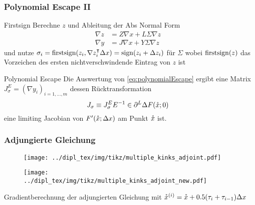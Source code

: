 \begin{frame}[<+->]
\frametitle{Polynomial Escape II}
\begin{block}{Firstsign}
 Berechne $z$ und Ableitung der Abs Normal Form
 \vspace*{-0.3cm}
 \begin{equation}\label{eq:polynomialEscape}
 \begin{aligned}
  \nabla z &= Z \nabla x + L \Sigma \nabla z\\
  \nabla y &= J\nabla x + Y\Sigma \nabla z
 \end{aligned}
 \end{equation}
 und nutze $
       \sigma_i = \operatorname{firstsign}(z_i,\nabla z_i^\intercal \Delta x) =\operatorname{sign} (z_i + \Delta z_i)
      $ für $\Sigma$
wobei $\operatorname{firstsign}(z)$ das Vorzeichen des ersten nichtverschwindende Eintrag von $z$ ist
\end{block}
\begin{block}{Polynomial Escape \cite[Prop. 8]{monster}}
Die Auswertung von \eqref{eq:polynomialEscape} ergibt eine Matrix $J_\sigma^E = (\nabla y_{i})_{i=1,\ldots,m}$ dessen Rücktransformation
\[
 J_\sigma\equiv J_\sigma^E E^{-1} \in \partial^L \Delta F(\mathring{x};0)
\]
eine limiting Jacobian von $F'(\mathring{x};\Delta x)$ am Punkt $\mathring{x}$ ist.
\end{block}

\end{frame}


\begin{frame}[<+->]
\frametitle{Adjungierte Gleichung}
\begin{figure}
\centering
\texttt{[image: ../dipl\_tex/img/tikz/multiple\_kinks\_adjoint.pdf]}
\end{figure}
\begin{figure}
\centering
\texttt{[image: ../dipl\_tex/img/tikz/multiple\_kinks\_adjoint\_new.pdf]}
\end{figure}
\centering
Gradientberechnung der adjungierten Gleichung mit $\mathring{x}^{(i)} = \mathring{x} + 0.5(\tau_i+\tau_{i-1})\Delta x$
\end{frame}

